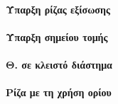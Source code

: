 \documentclass[11pt,a4paper,modern]{FFExercises}
\begin{document}
\paragraph{Ύπαρξη ρίζας εξίσωσης}
\askhsh
\paragraph{Ύπαρξη σημείου τομής}
\askhsh
\paragraph{Θ.  σε κλειστό διάστημα}
\askhsh
\paragraph{Ρίζα με τη χρήση ορίου}
\askhsh
\end{document}
